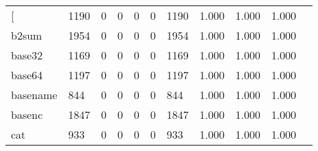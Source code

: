 \begin{longtable}{lp{1.10cm}p{1.10cm}p{1.10cm}p{1.10cm}p{1.10cm}p{1.10cm}p{1.10cm}p{1.10cm}p{1.10cm}p{1.10cm}}
\bottomrule
\endlastfoot
{[}         &                   1190 &                                  0 &                                 0 &                                0 &                                 0 &                            1190 &                             1.000 &                                 1.000 &                               1.000 \\
b2sum     &                   1954 &                                  0 &                                 0 &                                0 &                                 0 &                            1954 &                             1.000 &                                 1.000 &                               1.000 \\
base32    &                   1169 &                                  0 &                                 0 &                                0 &                                 0 &                            1169 &                             1.000 &                                 1.000 &                               1.000 \\
base64    &                   1197 &                                  0 &                                 0 &                                0 &                                 0 &                            1197 &                             1.000 &                                 1.000 &                               1.000 \\
basename  &                    844 &                                  0 &                                 0 &                                0 &                                 0 &                             844 &                             1.000 &                                 1.000 &                               1.000 \\
basenc    &                   1847 &                                  0 &                                 0 &                                0 &                                 0 &                            1847 &                             1.000 &                                 1.000 &                               1.000 \\
cat       &                    933 &                                  0 &                                 0 &                                0 &                                 0 &                             933 &                             1.000 &                                 1.000 &                               1.000 \\

\end{longtable}
